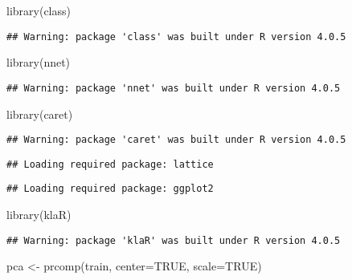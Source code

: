 \documentclass[
]{article}
\newenvironment{Shaded}{\begin{snugshade}}{\end{snugshade}}
\newcommand{\AttributeTok}[1]{\textcolor[rgb]{0.77,0.63,0.00}{#1}}
\newcommand{\ConstantTok}[1]{\textcolor[rgb]{0.00,0.00,0.00}{#1}}
\newcommand{\FunctionTok}[1]{\textcolor[rgb]{0.00,0.00,0.00}{#1}}
\newcommand{\NormalTok}[1]{#1}
\newcommand{\OtherTok}[1]{\textcolor[rgb]{0.56,0.35,0.01}{#1}}
\begin{document}
\begin{Shaded}
\begin{Highlighting}[]
\FunctionTok{library}\NormalTok{(class)}
\end{Highlighting}
\end{Shaded}

\begin{verbatim}
## Warning: package 'class' was built under R version 4.0.5
\end{verbatim}

\begin{Shaded}
\begin{Highlighting}[]
\FunctionTok{library}\NormalTok{(nnet)}
\end{Highlighting}
\end{Shaded}

\begin{verbatim}
## Warning: package 'nnet' was built under R version 4.0.5
\end{verbatim}

\begin{Shaded}
\begin{Highlighting}[]
\FunctionTok{library}\NormalTok{(caret)}
\end{Highlighting}
\end{Shaded}

\begin{verbatim}
## Warning: package 'caret' was built under R version 4.0.5
\end{verbatim}

\begin{verbatim}
## Loading required package: lattice
\end{verbatim}

\begin{verbatim}
## Loading required package: ggplot2
\end{verbatim}

\begin{Shaded}
\begin{Highlighting}[]
\FunctionTok{library}\NormalTok{(klaR)}
\end{Highlighting}
\end{Shaded}

\begin{verbatim}
## Warning: package 'klaR' was built under R version 4.0.5
\end{verbatim}

\begin{Shaded}
\begin{Highlighting}[]
\NormalTok{pca }\OtherTok{\textless{}{-}} \FunctionTok{prcomp}\NormalTok{(train, }\AttributeTok{center=}\ConstantTok{TRUE}\NormalTok{, }\AttributeTok{scale=}\ConstantTok{TRUE}\NormalTok{)}
\end{Highlighting}
\end{Shaded}
\end{document}
